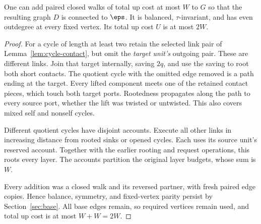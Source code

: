 \begin{theorem}\label{thm:connection}
One can add paired closed walks of total up cost at most $W$ to $G$
so that the resulting graph $D$ is connected to $\eps$. It is balanced,
$\tau$-invariant, and has even outdegree at every fixed vertex.
Its total up cost $U$ is at most $2W$.
\end{theorem}
\begin{proof}
For a cycle of length at least two retain the selected link pair of
Lemma~\ref{lem:cycle-contact}, but omit the \emph{target unit's} outgoing
pair. These are different links. Join that target internally, saving
$2q$, and use the saving to root both short contacts. The quotient
cycle with the omitted edge removed is a path ending at the target.
Every lifted component meets one of the retained contact pieces, which
touch both target ports. Rootedness propagates along the path to every
source port, whether the lift was twisted or untwisted. This also
covers mixed self and nonself cycles.

Different quotient cycles have disjoint accounts. Execute all other
links in increasing distance from rooted sinks or opened cycles.
Each uses its source unit's reserved account. Together with the earlier
rooting and request operations, this roots every layer. The accounts
partition the original layer budgets, whose sum is $W$.

Every addition was a closed walk and its reversed partner, with fresh
paired edge copies. Hence balance, symmetry, and fixed-vertex parity
persist by Section~\ref{sec:base}. All base edges remain, so required vertices
remain used, and total up cost is at most $W+W=2W$.
\end{proof}
